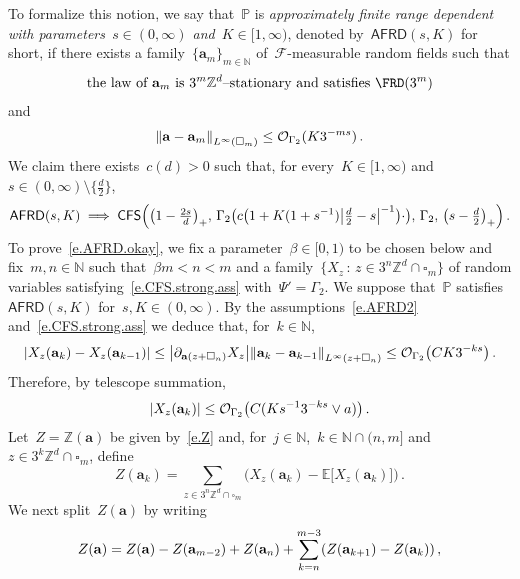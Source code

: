 \documentclass[11pt,twoside]{article} %
\let\oldsquare\square %
\renewcommand{\square}{\oldsquare}
\numberwithin{equation}{section}
\theoremstyle{definition}
\let\originalleft\left
\let\originalright\right
\renewcommand{\left}{\mathopen{}\mathclose\bgroup\originalleft}
\renewcommand{\right}{\aftergroup\egroup\originalright}
\newcommand*{\N}{\ensuremath{\mathbb{N}}}
\newcommand*{\Z}{\ensuremath{\mathbb{Z}}}
\newcommand*{\Zd}{\ensuremath{\mathbb{Z}^d}}
\renewcommand{\a}{\mathbf{a}}
\newcommand{\cu}{\square}
\newcommand{\F}{\mathcal{F}}
\renewcommand{\P}{\mathbb{P}}
\newcommand{\E}{\mathbb{E}}
\renewcommand{\O}{\mathcal{O}}
\newcommand{\CFS}{\mathsf{CFS}}
\newcommand{\AFRD}{\mathsf{AFRD}}
\begin{document}
To formalize this notion, 
we say that~$\P$ is \emph{approximately finite range dependent with parameters~$s \in (0,\infty)$ and~$K \in [1,\infty)$}, denoted by~$\AFRD(s,K)$ for short, if there exists a family~$\{ \a_m\}_{m\in\N}$ of~$\F$-measurable random fields such that 
\begin{align}
\label{e.AFRD1}
\text{the law of~$\a_m$ is~$3^m\Zd$--stationary and  satisfies~$\FRD(3^m)$} 
\end{align}
and
\begin{align}
\label{e.AFRD2}
\left\| \a - \a_m \right\|_{L^\infty(\cu_m)} 
\leq 
\O_{\Gamma_2}(K3^{-ms})
\,.
\end{align}
We claim there exists~$c(d)>0$ such that, for every~$K \in [1,\infty)$ and~$s \in (0,\infty) \setminus \{ \tfrac d2 \}$, 
\begin{equation}
\label{e.AFRD.okay}
\AFRD\left(s,K \right) \implies
\CFS \Bigl(  
\bigl( 1 - \tfrac {2s}{d} \bigr)_+ , \,
\Gamma_2 \bigl( c \bigl( 1 + K (1+s^{-1}) \bigl| \tfrac d2-s\bigr|^{-1} \bigr)   \cdot \bigr), \,
\Gamma_2, \, 
\bigl( s - \tfrac d2 \bigr)_+
\Bigr)\,.
\end{equation}
To prove~\eqref{e.AFRD.okay}, 
we fix a parameter~$\beta \in [0,1)$ to be chosen below and fix~$m,n\in\N$ such that~$\beta m < n < m$ and a family~$\{ X_z \,:\, z\in 3^n\Zd\cap \cu_m\}$ of random variables satisfying~\eqref{e.CFS.strong.ass} with~$\Psi'=\Gamma_2$.
We suppose that~$\P$ satisfies~$\AFRD(s,K)$ for~$s,K\in(0,\infty)$. By the assumptions~\eqref{e.AFRD2} and~\eqref{e.CFS.strong.ass} we deduce that, for~$k \in \N$, 
\begin{equation} 
\label{e.Xz.ak.diff}
\left| X_{z} (\a_k) - X_{z}(\a_{k-1}) \right| 
\leq
\left| \partial_{\a(z+\cu_n)} X_{z} \right| \left\| {\a}_k - {\a}_{k-1}  \right\|_{L^\infty(z+\cu_n)} 
\leq 
\O_{\Gamma_2} 
\left(CK3^{-k s} \right)
 \,.
\end{equation}
Therefore, by telescope summation, 
\begin{equation} 
\label{e.Xz.ak}
\left| X_{z} (\a_k) \right|  \leq \O_{\Gamma_2} 
\left(C(Ks^{-1} 3^{-k s} \vee a) \right) \,.
\end{equation}
Let~$Z=\Z(\a)$ be given by~\eqref{e.Z} and, 
for~$j \in \N$,~$k \in\N \cap (n,m]$ and~$z\in 3^k\Zd\cap\cu_m$, define
\begin{equation*}
Z(\a_k) = \sum_{z \in 3^n \Zd \cap \cu_m} \bigl( X_{z}(\a_k) - \E\bigl[ X_{z}(\a_k) \bigr]  \bigr) 
\,.
\end{equation*}
We next split~$Z(\a)$ by writing
\begin{equation*}
Z(\a) 
=
Z(\a) - Z({\a}_{m-2}) + Z({\a}_n) + \sum_{k=n}^{m-3} \left( Z({\a}_{k+1}) - Z({\a}_k) \right)\,,
\end{equation*}
\end{document}
